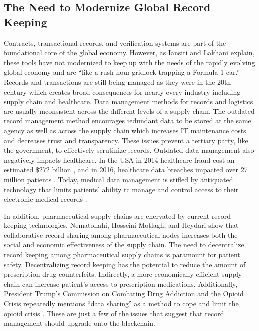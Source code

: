 \documentclass[sigconf]{acmart}
\begin{document}
\subsection{The Need to Modernize Global Record Keeping}
Contracts, transactional records, and verification systems are part of the foundational core of the global economy. However, as Iansiti and Lakhani \cite{hbr} explain, these tools have not modernized to keep up with the needs of the rapidly evolving global economy and are ``like a rush-hour gridlock trapping a Formula 1 car.'' Records and transactions are still being managed as they were in the 20th century which creates broad consequences for nearly every industry including supply chain and healthcare. Data management methods for records and logistics are usually inconsistent across the different levels of a supply chain. The outdated record management method encourages redundant data to be stored at the same agency as well as across the supply chain which increases IT maintenance costs and decreases trust and transparency. These issues prevent a tertiary party, like the government, to effectively scrutinize records. Outdated data management also negatively impacts healthcare. In the USA in 2014 healthcare fraud cost an estimated \$272 billion \cite{economist2014}, and in 2016, healthcare data breaches impacted over 27 million patients \cite{das2017}. Today, medical data management is stifled by antiquated technology that limits patients' ability to manage and control access to their electronic medical records \cite{ekblaw2016medrec}. 

In addition, pharmaceutical supply chains are enervated by current record-keeping technologies. Nematollahi, Hosseini-Motlagh, and Heydari \cite{Nematollahi01} show that collaborative record-sharing among pharmaceutical nodes increases both the social and economic effectiveness of the supply chain. The need to decentralize record keeping among pharmaceutical supply chains is paramount for patient safety. Decentralizing record keeping has the potential to reduce the amount of prescription drug counterfeits. Indirectly, a more economically efficient supply chain can increase patient's access to prescription medications. Additionally, President Trump's Commission on Combating Drug Addiction and the Opioid Crisis repeatedly mentions ``data sharing'' as a method to cope and limit the opioid crisis \cite{opsis3}. These are just a few of the issues that suggest that record management should upgrade onto the blockchain.
\end{document}
